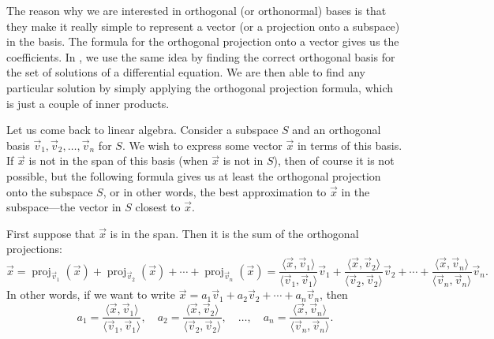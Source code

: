 The reason why we are interested in orthogonal (or orthonormal) bases is
that they make it really simple to represent a vector (or a projection onto
a subspace) in the basis.  The formula for the orthogonal projection
onto a vector gives us the coefficients.  In
, we use the same idea by finding the correct
orthogonal basis for the set of solutions of a differential equation.
We are then able to find any particular solution by simply applying the
orthogonal projection formula, which is just a couple of inner products.

Let us come back to linear algebra.  Consider a subspace $S$
and an orthogonal
basis $\vec{v}_1, \vec{v}_2, \ldots, \vec{v}_n$ for $S$.
We wish to
express some vector $\vec{x}$ in terms of this basis.
If $\vec{x}$ is not in the span
of this basis (when $\vec{x}$ is not in $S$),
then of course it is not possible,
but the following formula
gives us at least the orthogonal projection onto the subspace $S$,
or in other words, the best approximation
to $\vec{x}$ in the subspace---the vector in $S$ closest to $\vec{x}$.

First suppose that $\vec{x}$ is in the span.  Then it is the sum of the
orthogonal projections:
\begin{equation*}
\vec{x} =
\operatorname{proj}_{\vec{v}_1} ( \vec{x} )
+
\operatorname{proj}_{\vec{v}_2} ( \vec{x} )
+
\cdots
+
\operatorname{proj}_{\vec{v}_n} ( \vec{x} )
=
\frac{\langle \vec{x}, \vec{v}_1 \rangle}{
\langle \vec{v}_1, \vec{v}_1 \rangle
}
\vec{v}_1
+
\frac{\langle \vec{x}, \vec{v}_2 \rangle}{
\langle \vec{v}_2, \vec{v}_2 \rangle
}
\vec{v}_2
+
\cdots
+
\frac{\langle \vec{x}, \vec{v}_n \rangle}{
\langle \vec{v}_n, \vec{v}_n \rangle
}
\vec{v}_n .
\end{equation*}
In other words, if we want to write
$\vec{x} =
a_1 \vec{v}_1 +
a_2 \vec{v}_2 + \cdots +
a_n \vec{v}_n$, then
\begin{equation*}
a_1 =
\frac{\langle \vec{x}, \vec{v}_1 \rangle}{
\langle \vec{v}_1, \vec{v}_1 \rangle
} , \quad
a_2 =
\frac{\langle \vec{x}, \vec{v}_2 \rangle}{
\langle \vec{v}_2, \vec{v}_2 \rangle
} , \quad \ldots , \quad
a_n =
\frac{\langle \vec{x}, \vec{v}_n \rangle}{
\langle \vec{v}_n, \vec{v}_n \rangle
} .
\end{equation*}

